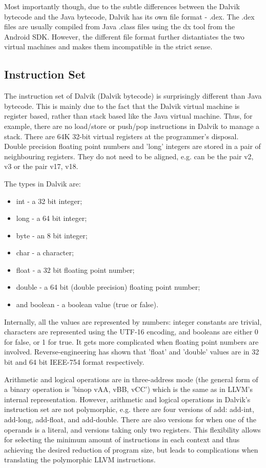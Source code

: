 \documentclass[parskip]{cs4rep}
\begin{document}
Most importantly though, due to the subtle differences between the Dalvik bytecode and the Java bytecode, Dalvik has its own file format - .dex. The .dex files are usually compiled from Java .class files using the dx tool from the Android SDK. However, the different file format further distantiates the two virtual machines and makes them incompatible in the strict sense.

\subsection{Instruction Set} \label{sec:DalvikInstructionSet}

The instruction set of Dalvik (Dalvik bytecode) is surprisingly different than Java bytecode. This is mainly due to the fact that the Dalvik virtual machine is register based, rather than stack based like the Java virtual machine. Thus, for example, there are no load/store or push/pop instructions in Dalvik to manage a stack. There are 64K 32-bit virtual registers at the programmer's disposal. Double precision floating point numbers and 'long' integers are stored in a pair of neighbouring registers. They do not need to be aligned, e.g. can be the pair {v2, v3} or the pair {v17, v18}.

The types in Dalvik are:
\begin{itemize}
\item int - a 32 bit integer;
\item long - a 64 bit integer;
\item byte - an 8 bit integer;
\item char - a character;
\item float - a 32 bit floating point number;
\item double - a 64 bit (double precision) floating point number;
\item and boolean - a boolean value (true or false).
\end{itemize}
Internally, all the values are represented by numbers: integer constants are trivial, characters are represented using the UTF-16 encoding, and booleans are either 0 for false, or 1 for true. It gets more complicated when floating point numbers are involved. Reverse-engineering has shown that 'float' and 'double' values are in 32 bit and 64 bit IEEE-754 format respectively.

Arithmetic and logical operations are in three-address mode\cite{TheAndroidOpenSourceProject2007} (the general form of a binary operation is 'binop vAA, vBB, vCC') which is the same as in LLVM's internal representation. However, arithmetic and logical operations in Dalvik's instruction set are not polymorphic, e.g. there are four versions of add: add-int, add-long, add-float, and add-double. There are also versions for when one of the operands is a literal, and versions taking only two registers. This flexibility allows for selecting the minimum amount of instructions in each context and thus achieving the desired reduction of program size, but leads to complications when translating the polymorphic LLVM instructions.
\end{document}
